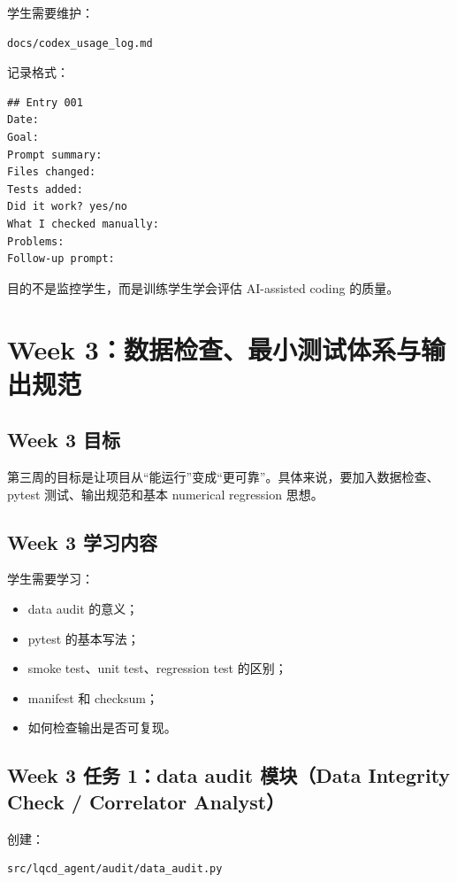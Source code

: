 \documentclass[11pt,a4paper,fontset=fandol]{ctexart}
\begin{document}
学生需要维护：

\begin{lstlisting}
docs/codex_usage_log.md
\end{lstlisting}

记录格式：

\begin{lstlisting}
## Entry 001
Date:
Goal:
Prompt summary:
Files changed:
Tests added:
Did it work? yes/no
What I checked manually:
Problems:
Follow-up prompt:
\end{lstlisting}

目的不是监控学生，而是训练学生学会评估 AI-assisted coding 的质量。

\section{Week 3：数据检查、最小测试体系与输出规范}

\subsection{Week 3 目标}

第三周的目标是让项目从“能运行”变成“更可靠”。具体来说，要加入数据检查、pytest 测试、输出规范和基本 numerical regression 思想。

\subsection{Week 3 学习内容}

学生需要学习：

\begin{itemize}[leftmargin=2em]
  \item data audit 的意义；
  \item pytest 的基本写法；
  \item smoke test、unit test、regression test 的区别；
  \item manifest 和 checksum；
  \item 如何检查输出是否可复现。
\end{itemize}

\subsection{Week 3 任务 1：data audit 模块（Data Integrity Check / Correlator Analyst）}

创建：

\begin{lstlisting}
src/lqcd_agent/audit/data_audit.py
\end{lstlisting}
\end{document}
